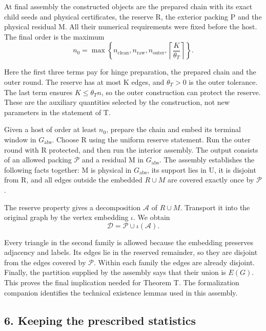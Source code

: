 \documentclass[english,11pt,a4paper]{article}
\begin{document}
At final assembly the constructed objects are the prepared chain with its exact child seeds and physical certificates, the reserve R, the exterior packing P and the physical residual M. All their numerical requirements were fixed before the host. The final order is the maximum
\[n_0=\max\left\{
n_{\mathrm{clean}},n_{\mathrm{raw}},n_{\mathrm{outer}},
\left\lceil\frac{K}{\theta_T}\right\rceil
\right\}.                                                         \tag{5.2}\]

Here the first three terms pay for hinge preparation, the prepared chain and the outer round. The reserve has at most K edges, and \(\theta_T>0\) is the outer tolerance. The last term ensures \(K\leq\theta_T n\), so the outer construction can protect the reserve. These are the auxiliary quantities selected by the construction, not new parameters in the statement of T.

Given a host of order at least \(n_0\), prepare the chain and embed its terminal window in \(G_{\mathrm{abs}}\). Choose R using the uniform reserve statement. Run the outer round with R protected, and then run the interior assembly. The output consists of an allowed packing \(\mathcal P\) and a residual M in \(G_{\mathrm{abs}}\). The assembly establishes the following facts together: M is physical in \(G_{\mathrm{abs}}\), its support lies in U, it is disjoint from R, and all edges outside the embedded \(R\cup M\) are covered exactly once by \(\mathcal P\).

The reserve property gives a decomposition \(\mathcal A\) of \(R\cup M\). Transport it into the original graph by the vertex embedding \(\iota\). We obtain
\[\mathcal D=\mathcal P\cup\iota(\mathcal A).                         \tag{5.3}\]

Every triangle in the second family is allowed because the embedding preserves adjacency and labels. Its edges lie in the reserved remainder, so they are disjoint from the edges covered by \(\mathcal P\). Within each family the edges are already disjoint. Finally, the partition supplied by the assembly says that their union is \(E(G)\). This proves the final implication needed for Theorem T. The formalization companion identifies the technical existence lemmas used in this assembly.

\subsection{6. Keeping the prescribed statistics}\label{keeping-the-prescribed-statistics}
\end{document}
